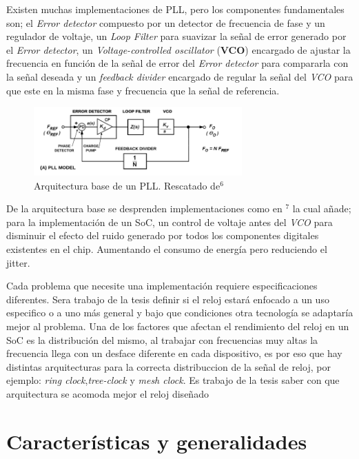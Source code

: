 \documentclass[runningheads,a4paper]{llncs}
\begin{document}
    Existen muchas implementaciones de PLL, pero los componentes fundamentales son; el \textit{Error detector} compuesto por un detector de frecuencia de fase y un regulador de voltaje, un \textit{Loop Filter} para suavizar la señal de error generado por el \textit{Error detector}, un \textit{Voltage-controlled oscillator} (\textbf{VCO}) encargado de ajustar la frecuencia en función de la señal de error del \textit{Error detector} para compararla con la señal deseada y un \textit{feedback divider} encargado de regular la señal del \textit{VCO} para que este en la misma fase y frecuencia que la señal de referencia.\\ 

\begin{figure}[t]
\includegraphics[width=8cm]{PLL.png}
\centering
\caption{Arquitectura base de un PLL. Rescatado de${}^6$}
\end{figure}

    De la arquitectura base se desprenden implementaciones como en ${}^7$ la cual añade; para la implementación de un SoC, un control de voltaje antes del \textit{VCO} para disminuir el efecto del ruido generado por todos los componentes digitales existentes en el chip. Aumentando el consumo de energía pero reduciendo el jitter.

    Cada problema que necesite una implementación requiere especificaciones diferentes. Sera trabajo de la tesis definir si el reloj estará enfocado a un uso especifico o a uno más general y bajo que condiciones otra tecnología se adaptaría mejor al problema. Una de los factores que afectan el rendimiento del reloj en un SoC es la distribución del mismo, al trabajar con frecuencias muy altas la frecuencia llega con un desface diferente en cada dispositivo, es por eso que hay distintas arquitecturas para la correcta distribuccion de la señal de reloj, por ejemplo: \textit{ring clock},\textit{tree-clock} y \textit{mesh clock}. Es trabajo de la tesis saber con que arquitectura se acomoda mejor el reloj diseñado\\


\section{Características y generalidades}
\end{document}
